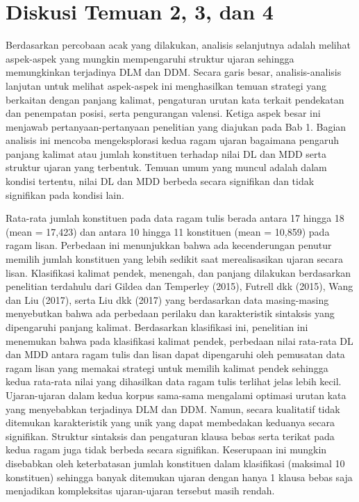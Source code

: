 \section{Diskusi Temuan 2, 3, dan 4}
Berdasarkan percobaan acak yang dilakukan, analisis selanjutnya adalah melihat aspek-aspek yang mungkin mempengaruhi struktur ujaran sehingga memungkinkan terjadinya DLM dan DDM. Secara garis besar, analisis-analisis lanjutan untuk melihat aspek-aspek ini menghasilkan temuan strategi yang berkaitan dengan panjang kalimat, pengaturan urutan kata terkait pendekatan dan penempatan posisi, serta pengurangan valensi. Ketiga aspek besar ini menjawab pertanyaan-pertanyaan penelitian yang diajukan pada Bab 1. Bagian analisis ini mencoba mengeksplorasi kedua ragam ujaran bagaimana pengaruh panjang kalimat atau jumlah konstituen terhadap nilai DL dan MDD serta struktur ujaran yang terbentuk. Temuan umum yang muncul adalah dalam kondisi tertentu, nilai DL dan MDD berbeda secara signifikan dan tidak signifikan pada kondisi lain.

Rata-rata jumlah konstituen pada data ragam tulis berada antara 17 hingga 18 (mean = 17,423) dan antara 10 hingga 11 konstituen (mean = 10,859) pada ragam lisan. Perbedaan ini menunjukkan bahwa ada kecenderungan penutur memilih jumlah konstituen yang lebih sedikit saat merealisasikan ujaran secara lisan. Klasifikasi kalimat pendek, menengah, dan panjang dilakukan berdasarkan penelitian terdahulu dari Gildea dan Temperley (2015), Futrell dkk (2015), Wang dan Liu (2017), serta Liu dkk (2017) yang berdasarkan data masing-masing menyebutkan bahwa ada perbedaan perilaku dan karakteristik sintaksis yang dipengaruhi panjang kalimat. Berdasarkan klasifikasi ini, penelitian ini menemukan bahwa pada klasifikasi kalimat pendek, perbedaan nilai rata-rata DL dan MDD antara ragam tulis dan lisan dapat dipengaruhi oleh pemusatan data ragam lisan yang memakai strategi untuk memilih kalimat pendek sehingga kedua rata-rata nilai yang dihasilkan data ragam tulis terlihat jelas lebih kecil. Ujaran-ujaran dalam kedua korpus sama-sama mengalami optimasi urutan kata yang menyebabkan terjadinya DLM dan DDM. Namun, secara kualitatif tidak ditemukan karakteristik yang unik yang dapat membedakan keduanya secara signifikan. Struktur sintaksis dan pengaturan klausa bebas serta terikat pada kedua ragam juga tidak berbeda secara signifikan. Keserupaan ini mungkin disebabkan oleh keterbatasan jumlah konstituen dalam klasifikasi (maksimal 10 konstituen) sehingga banyak ditemukan ujaran dengan hanya 1 klausa bebas saja menjadikan kompleksitas ujaran-ujaran tersebut masih rendah.

